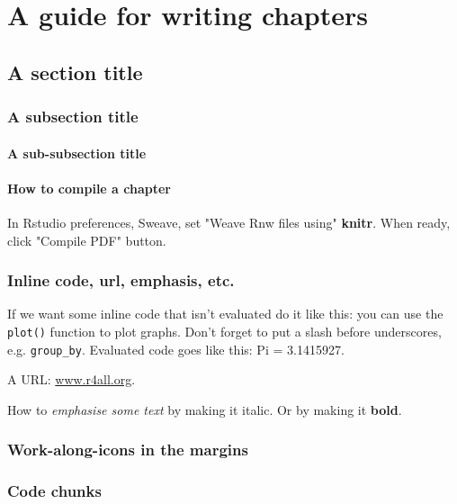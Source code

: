 \documentclass[10pt,a4paper]{book}\usepackage[]{graphicx}\usepackage[]{color}
\begin{document}

\chapter{A guide for writing chapters}

\section{A section title}

\subsection{A subsection title}

\subsubsection{A sub-subsection title}

\subsubsection{How to compile a chapter}

In Rstudio preferences, Sweave, set "Weave Rnw files using" \textbf{knitr}. When ready, click "Compile PDF" button.

\subsection{Inline code, url, emphasis, etc.}

If we want some inline code that isn't evaluated do it like this: you can use the \texttt{plot()} function to plot graphs. Don't forget to put a slash before underscores, e.g. \texttt{group\_by}. Evaluated code goes like this: Pi = 3.1415927.

A URL: \url{www.r4all.org}.

How to \emph{emphasise some text} by making it italic. Or by making it \textbf{bold}.


\subsection{Work-along-icons in the margins}





\subsection{Code chunks}
\end{document}
